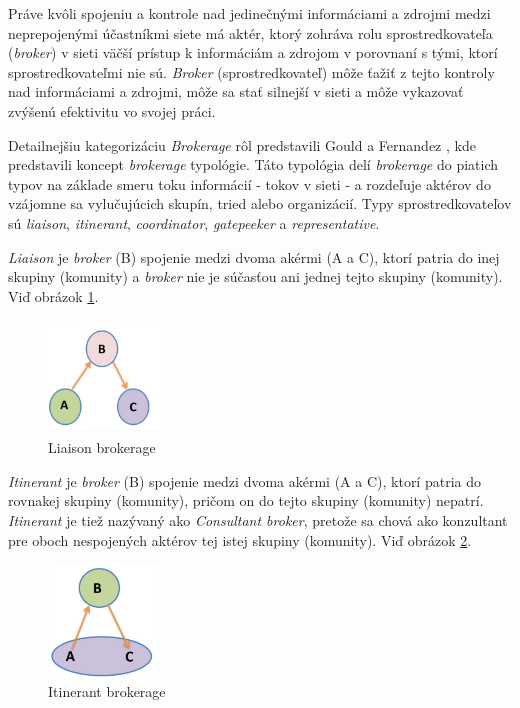\documentclass[slovak,master,public,dept460,male,cpdeclaration,oneside]{diploma}
\begin{document}
Práve kvôli spojeniu a kontrole nad jedinečnými informáciami a zdrojmi medzi neprepojenými účastníkmi siete má aktér, ktorý zohráva rolu sprostredkovateľa (\textit{broker}) v sieti väčší prístup k informáciám a zdrojom v porovnaní s tými, ktorí sprostredkovateľmi nie sú. \textit{Broker} (sprostredkovateľ) môže ťažiť z tejto kontroly nad informáciami a zdrojmi, môže sa stať silnejší v sieti a môže vykazovať zvýšenú efektivitu vo svojej práci. \cite{16}


Detailnejšiu kategorizáciu \textit{Brokerage} rôl predstavili Gould a Fernandez \cite{15}, kde predstavili koncept \textit{brokerage} typológie. Táto typológia delí \textit{brokerage} do piatich typov na základe smeru toku informácií - tokov v sieti - a rozdeľuje aktérov do vzájomne sa vylučujúcich skupín, tried alebo organizácií.
Typy sprostredkovateľov sú \textit{liaison}, \textit{itinerant}, \textit{coordinator}, \textit{gatepeeker} a \textit{representative}.


\begin{definition}
\textit{Liaison} je \textit{broker} (B) spojenie  medzi dvoma akérmi (A a C), ktorí patria do inej skupiny (komunity) a \textit{broker} nie je súčasťou ani jednej tejto skupiny (komunity). Viď obrázok \ref{liaison}.
\end{definition}

\begin{figure}[H]
\centering
\includegraphics[width=3cm, height=3cm]{figures/liaison}
\caption{Liaison brokerage}
\label{liaison}
\end{figure}


\begin{definition}
\textit{Itinerant} je \textit{broker} (B) spojenie medzi dvoma akérmi (A a C), ktorí patria do rovnakej skupiny (komunity), pričom on do tejto skupiny (komunity) nepatrí. \textit{Itinerant} je tiež nazývaný ako \textit{Consultant broker}, pretože sa chová ako konzultant pre oboch nespojených aktérov tej istej skupiny (komunity). Viď obrázok \ref{itineran}.
\end{definition}

\begin{figure}[H]
\centering
\includegraphics[width=3cm, height=3cm]{figures/itineran}
\caption{Itinerant brokerage}
\label{itineran}
\end{figure}
\end{document}
